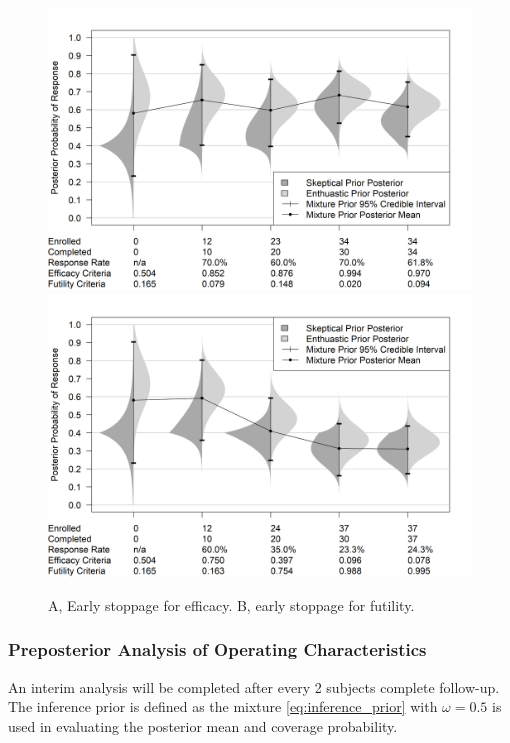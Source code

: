 \documentclass[12pt]{article}
\begin{document}
\begin{figure}\begin{center}
    \includegraphics[width=7in]{./FIGURES/figure2a.png}
    \includegraphics[width=7in]{./FIGURES/figure2b.png}
    \caption{A, Early stoppage for efficacy. B, early stoppage for futility.}
	\label{fig:figure2}

 
\end{center}\end{figure}
\subsubsection{Preposterior Analysis of Operating Characteristics}\label{sec:ex1.1}
An interim analysis will be completed after every 2 subjects complete follow-up. The inference prior is defined as the mixture \eqref{eq:inference_prior} with $\omega=0.5$ is used in evaluating the posterior mean and coverage probability.
\end{document}
